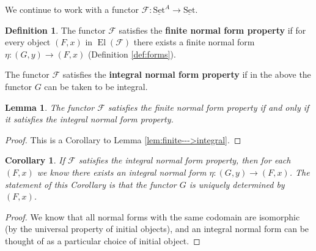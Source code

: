 \documentclass[12pt]{article}
\theoremstyle{plain}
\newtheorem{lemma}[thm]{Lemma}
\newtheorem{cor}[thm]{Corollary}
\theoremstyle{definition}
\newtheorem{defn}[thm]{Definition} %
\newcommand{\scr}[1]{\mathscr{#1}}
\newcommand{\lto}{\longrightarrow}
\newcommand{\set}{\operatorname{\underline{Set}}}
\begin{document}
	We continue to work with a functor $\scr{F}: \set^A \lto \set$.
	
	\begin{defn}\label{def:normal_form_property}
		The functor $\scr{F}$ satisfies the \textbf{finite normal form property} if for every object $(F,x)$ in $\operatorname{El}(\scr{F})$ there exists a finite normal form $\eta: (G,y) \lto (F,x)$ (Definition \ref{def:forms}).
		
		The functor $\scr{F}$ satisfies the \textbf{integral normal form property} if in the above the functor $G$ can be taken to be integral.
		\end{defn}
	
	\begin{lemma}
		The functor $\scr{F}$ satisfies the finite normal form property if and only if it satisfies the integral normal form property.
		\end{lemma}
	\begin{proof}
		This is a Corollary to Lemma \ref{lem:finite--->integral}.
		\end{proof}
	
	\begin{cor}
		If $\scr{F}$ satisfies the integral normal form property, then for each $(F,x)$ we know there exists an integral normal form $\eta: (G, y) \lto (F,x)$. The statement of this Corollary is that the functor $G$ is uniquely determined by $(F,x)$.
		\end{cor}
	\begin{proof}
		We know that all normal forms with the same codomain are isomorphic (by the universal property of initial objects), and an integral normal form can be thought of as a particular choice of initial object.
		\end{proof}
	
\end{document}
